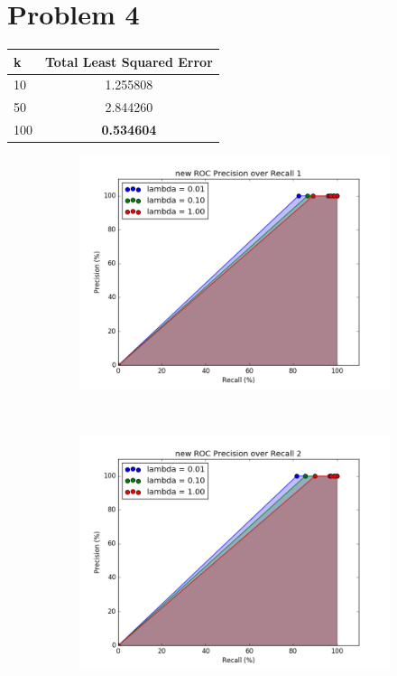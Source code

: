 \documentclass[12pt]{article}
\begin{document}
\section*{Problem 4}
\begin{center}
\begin{tabular}{|l | c|}
\hline
k & Total Least Squared Error \\ \hline
10 & 1.255808 \\
50 & 2.844260 \\
100 & \textbf{0.534604} \\ \hline
\end{tabular}
\end{center}

\begin{figure}[h!]
    \centering
    \begin{subfigure}[t]{0.5\textwidth}
        \centering
        \includegraphics[width=1.\textwidth]{graphs/problem4_ROC1}
        \caption{}
    \end{subfigure}%
    ~ 
    \begin{subfigure}[t]{0.5\textwidth}
        \centering
        \includegraphics[width=1.\textwidth]{graphs/problem4_ROC2}
        \caption{}
    \end{subfigure}%
\end{figure}
\end{document}

